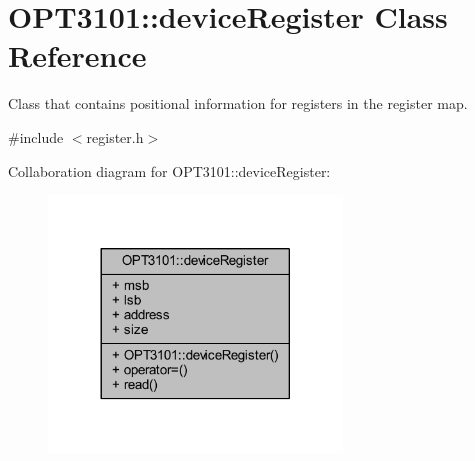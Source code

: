 \hypertarget{class_o_p_t3101_1_1device_register}{}\section{O\+P\+T3101\+:\+:device\+Register Class Reference}
\label{class_o_p_t3101_1_1device_register}


Class that contains positional information for registers in the register map.  




{\ttfamily \#include $<$register.\+h$>$}



Collaboration diagram for O\+P\+T3101\+:\+:device\+Register\+:\nopagebreak
\begin{figure}[H]
\begin{center}
\leavevmode
\includegraphics[width=221pt]{class_o_p_t3101_1_1device_register__coll__graph}
\end{center}
\end{figure}
